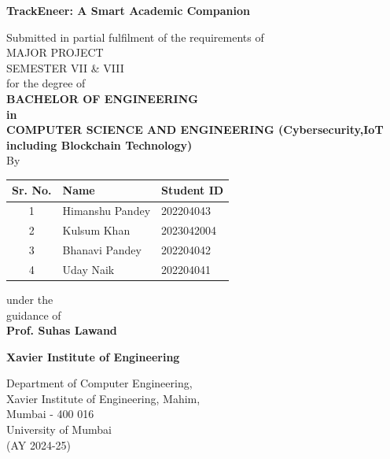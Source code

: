 \documentclass[12pt]{article}
\begin{document}
\begin{titlepage}
    \centering
    \vspace*{1cm}
    
    {\Large\bfseries TrackEneer: A Smart Academic Companion\\[0.2cm]}
    
    \vspace{1cm}
    
    {\large Submitted in partial fulfilment of the requirements of\\[0.5cm]
    MAJOR PROJECT\\[0.3cm]
    SEMESTER VII \& VIII\\[0.5cm]
    for the degree of\\[0.5cm]
    \bfseries BACHELOR OF ENGINEERING\\[0.2cm]
    in\\[0.2cm]
    \bfseries COMPUTER SCIENCE AND ENGINEERING
    (Cybersecurity,IoT including Blockchain Technology)}\\[0.5cm]

    {\large By} \\[0.5cm]

    \begin{tabular}{|c|l|l|}
        \hline
        \textbf{Sr. No.} & \textbf{Name}     & \textbf{Student ID} \\ \hline
        1                & Himanshu Pandey   & 202204043           \\ \hline
        2                & Kulsum Khan       & 2023042004          \\ \hline
        3                & Bhanavi Pandey    & 202204042           \\ \hline
        4                & Uday Naik         & 202204041           \\ \hline
    \end{tabular}

    \vspace{1cm}

    {\large under the\\[0.3cm] guidance of} \\[0.5cm]

    {\textbf {\large Prof. Suhas Lawand}}\\[0.1cm]
    
    \vspace{1cm}
    
    {\large \textbf{Xavier Institute of Engineering}}
    \vspace{1cm}

    {\large Department of Computer Engineering,\\[0.2cm]
    Xavier Institute of Engineering, Mahim,\\[0.2cm]
    Mumbai - 400 016}\\[0.5cm]

    {\large University of Mumbai}\\[0.3cm]

    {\large (AY 2024-25)}
\end{titlepage}
\end{document}
